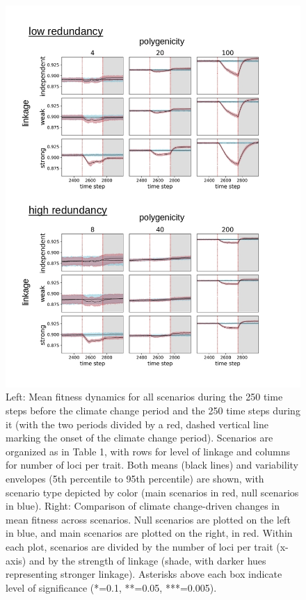 \documentclass[9pt,twocolumn,twoside,lineno]{pnas-new}
\begin{document}
\begin{figure}[\sidecaptionrelwidth][t]
\centering
\includegraphics[width=17.8cm]{pub/figs/FIG_3_fit_over_time.jpg}
\caption{Left: Mean fitness dynamics for all scenarios during the 250 time steps before the climate change period and the 250 time steps during it (with the two periods divided by a red, dashed vertical line marking the onset of the climate change period). Scenarios are organized as in Table 1, with rows for level of linkage and columns for number of loci per trait. Both means (black lines) and variability envelopes (5th percentile to 95th percentile) are shown, with scenario type depicted by color (main scenarios in red, null scenarios in blue). Right: Comparison of climate change-driven changes in mean fitness across scenarios. Null scenarios are plotted on the left in blue, and main scenarios are plotted on the right, in red. Within each plot, scenarios are divided by the number of loci per trait (x-axis) and by the strength of linkage (shade, with darker hues representing stronger linkage). Asterisks above each box indicate level of significance (*=0.1, **=0.05, ***=0.005).}
\label{fig:fig_3}
\end{figure}
\end{document}
